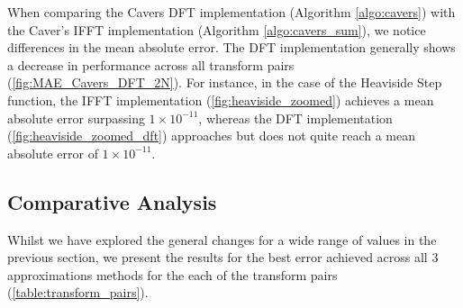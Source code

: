 \documentclass[a4paper]{report}
\begin{document}
When comparing the Cavers DFT implementation (Algorithm \ref{algo:cavers}) with the Caver's IFFT implementation (Algorithm \ref{algo:cavers_sum}), we notice differences in the mean absolute error. The DFT implementation generally shows a decrease in performance across all transform pairs (\autoref{fig:MAE_Cavers_DFT_2N}). For instance, in the case of the Heaviside Step function, the IFFT implementation (\autoref{fig:heaviside_zoomed}) achieves a mean absolute error surpassing $1 \times 10^{-11}$, whereas the DFT implementation (\autoref{fig:heaviside_zoomed_dft}) approaches but does not quite reach a mean absolute error of $1 \times 10^{-11}$.

\subsection{Comparative Analysis}
Whilst we have explored the general changes for a wide range of values in the previous section, we present the results for the best error achieved across all 3 approximations methods for the each of the transform pairs (\autoref{table:transform_pairs}).
\end{document}
